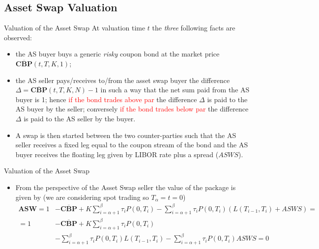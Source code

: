 \documentclass{beamer}
\begin{document}
\subsection{Asset Swap Valuation}
\begin{frame}{Valuation of the Asset Swap}
	At valuation time $t$ the \emph{three} following facts are observed:
	\begin{itemize}
		\item<2-> the AS buyer buys a generic \emph{risky} coupon bond at the market price $\overline{\textbf{CBP}}(t,T,K,1)$;
		\item<3-> the AS seller pays/receives to/from the asset swap buyer the difference $\Delta = \overline{\textbf{CBP}}(t,T,K,N)-1$ in such a way that the net sum paid from the AS buyer is 1; hence \textcolor{red}{if the bond trades above par} the difference $\Delta$ is paid to the AS buyer by the seller; conversely \textcolor{red}{if the bond trades below par} the difference $\Delta$ is paid to the AS seller by the buyer.
		\item<4-> A swap is then started between the two counter-parties such that the AS seller receives a fixed leg equal to the coupon stream of the bond and the AS buyer receives the floating leg given by LIBOR rate plus a spread ($ASWS$).
	\end{itemize}
\end{frame}

\begin{frame}{Valuation of the Asset Swap}
	\begin{itemize}
		\item From the perspective of the Asset Swap seller the value of the package is given by (we are considering spot trading so $T_\alpha = t = 0$)
		\begin{equation}
			\begin{aligned}
				\textbf{ASW}=1&-\overline{\textbf{CBP}}+K\sum_{i=\alpha+1}^{\beta}\tau_i P(0,T_i)-\sum_{i=\alpha+1}^{\beta}\tau_i P(0,T_i)(L(T_{i-1},T_i)+ASWS) =\\
				=1&-\overline{\textbf{CBP}}+K\sum_{i=\alpha+1}^{\beta}\tau_i P(0,T_i)\\
				&-\sum_{i=\alpha+1}^{\beta}\tau_i P(0,T_i)L(T_{i-1},T_i)-\sum_{i=\alpha+1}^{\beta}\tau_i P(0,T_i)ASWS=0
			\end{aligned}
			\label{eq:asset_swap_value}
		\end{equation}
	\end{itemize}
\end{frame}
\end{document}
